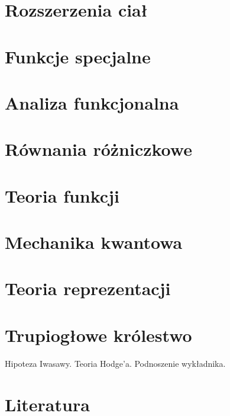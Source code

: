 \chapter{Rozszerzenia ciał}
  
  
  
  
  
  
  
  
  

\chapter{Funkcje specjalne\label{parum}}
  
  
  

  

  
  

  
  
  

   
   
   
   
   
   

\chapter{Analiza funkcjonalna}


\chapter{Równania różniczkowe}
  

\chapter{Teoria funkcji}


\chapter{Mechanika kwantowa}
  

\chapter{Teoria reprezentacji}


\chapter{Trupiogłowe królestwo}
Hipoteza Iwasawy.
Teoria Hodge'a.
Podnoszenie wykładnika.

\chapter*{Literatura}
	